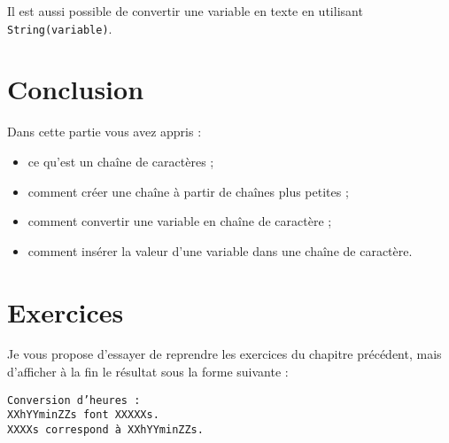 Il est aussi possible de convertir une variable en texte en utilisant \texttt{String(variable)}.

\section*{Conclusion}
{}
Dans cette partie vous avez appris :
\begin{itemize}
\item ce qu'est un chaîne de caractères ;
\item comment créer une chaîne à partir de chaînes plus petites ;
\item comment convertir une variable en chaîne de caractère ;
\item comment insérer la valeur d'une variable dans une chaîne de caractère.
\end{itemize}
\section*{Exercices}
{}
Je vous propose d'essayer de reprendre les exercices du chapitre précédent, mais d'afficher à la fin le résultat sous la forme suivante :
\begin{verbatim}
Conversion d’heures :
XXhYYminZZs font XXXXXs.
XXXXs correspond à XXhYYminZZs.
\end{verbatim}
